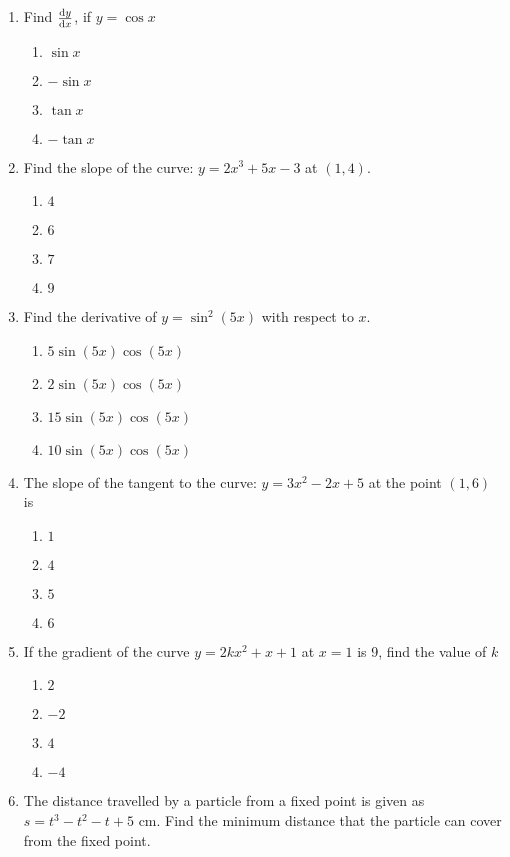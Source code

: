 \begin{multicols}{2}
\begin{enumerate}[label={\arabic*.}]
\begin{enumerate}[label={\Alph*.}]
	\end{enumerate}
\item Find \(\dv{y}{x}\), if \(y = \cos{x}\)
	\begin{enumerate}[label={\Alph*.}]
	\item \(\sin{x}\)
	\item \(-\sin{x}\)
	\item \(\tan{x}\)
	\item \(-\tan{x}\)
	\end{enumerate}
\item Find the slope of the curve: \(y = 2{x}^{3}+ 5{x}-3\) at \((1,4)\).
	\begin{enumerate}[label={\Alph*.}]
	\item \(4\)
	\item \(6\)
	\item \(7\)
	\item \(9\)
	\end{enumerate}
\item Find the derivative of \(y = \sin^{2}{(5x)}\) with respect to \(x\).
	\begin{enumerate}[label={\Alph*.}]
	\item \(5 \sin{(5x)\cos{(5x)}}\)
	\item \(2 \sin{(5x)\cos{(5x)}}\)
	\item \(15 \sin{(5x)\cos{(5x)}}\)
	\item \(10 \sin{(5x)\cos{(5x)}}\)
	\end{enumerate}
\item The slope of the tangent to the curve: \(y=3{x}^{2}-2x+5\) at the point \((1,6)\) is
	\begin{enumerate}[label={\Alph*.}]
	\item \(1\)
	\item \(4\)
	\item \(5\)
	\item \(6\)
	\end{enumerate}
\item If the gradient of the curve \(y=2k{x}^{2}+x+1\) at \(x = 1\) is 9, find the value of \(k\)
	\begin{enumerate}[label={\Alph*.}]
	\item \(2\)
	\item \(-2\)
	\item \(4\)
	\item \(-4\)
	\end{enumerate}
\item The distance travelled by a particle from a fixed point is given as \(s = {t}^{3}-{t}^{2}-t+5\) cm. Find the minimum distance that the particle can cover from the fixed point.

\end{enumerate}
\end{multicols}
